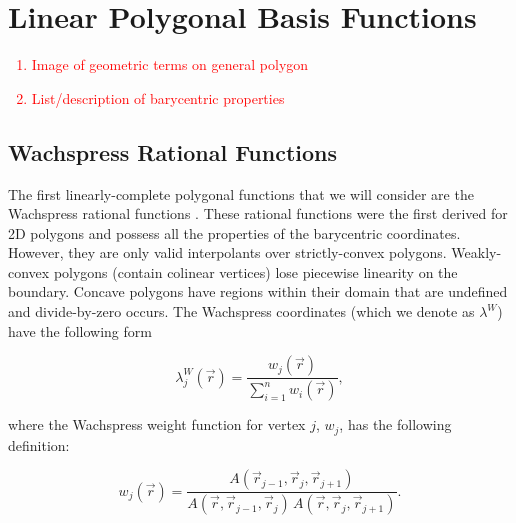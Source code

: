 \documentclass[preprint,10pt]{elsarticle}
\newcommand{\tcr}[1]{\textcolor{red}{#1}}
\begin{document}
\section{Linear Polygonal Basis Functions} \label{sec::linpoly}
\tcr
{
\begin{enumerate}
\item Image of geometric terms on general polygon
\item List/description of barycentric properties
\end{enumerate}
}

\subsection{Wachspress Rational Functions}

The first linearly-complete polygonal functions that we will consider are the Wachspress rational functions \cite{wachspress1975rational}. These rational functions were the first derived for 2D polygons and possess all the properties of the barycentric coordinates. However, they are only valid interpolants over strictly-convex polygons. Weakly-convex polygons (contain colinear vertices) lose piecewise linearity on the boundary. Concave polygons have regions within their domain that are undefined and divide-by-zero occurs. The Wachspress coordinates (which we denote as $\lambda^W$) have the following form

\begin{equation}
\label{eq::wach_BF}
\lambda_{j}^{W} (\vec{r}) = \frac{w_j (\vec{r}) }{\sum\limits_{i=1}^{n} w_i (\vec{r})},
\end{equation}

\noindent where the Wachspress weight function for vertex $j$, $w_j$, has the following definition:

\begin{equation}
\label{eq::wach_weights}
w_j (\vec{r})  = \frac{A(\vec{r}_{j-1}, \vec{r}_{j}, \vec{r}_{j+1})}{A(\vec{r}, \vec{r}_{j-1}, \vec{r}_{j}) \, A(\vec{r}, \vec{r}_{j}, \vec{r}_{j+1})} .
\end{equation}
\end{document}
